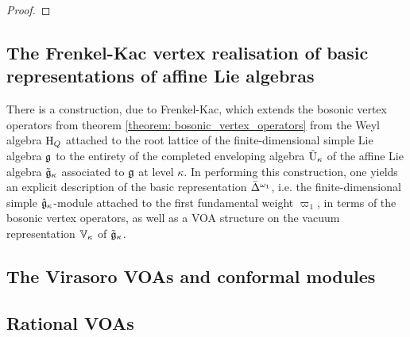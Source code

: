             \begin{theorem} \label{theorem: bosonic_vertex_operators}
                
            \end{theorem}
                \begin{proof}
                    
                \end{proof}

    \subsection{The Frenkel-Kac vertex realisation of basic representations of affine Lie algebras}
        There is a construction, due to Frenkel-Kac, which extends the bosonic vertex operators from theorem \ref{theorem: bosonic_vertex_operators} from the Weyl algebra $\mathrm{H}_Q$ attached to the root lattice of the finite-dimensional simple Lie algebra $\mathfrak{g}$ to the entirety of the completed enveloping algebra $\tilde{\mathrm{U}}_{\kappa}$ of the affine Lie algebra $\tilde{\mathfrak{g}}_{\kappa}$ associated to $\mathfrak{g}$ at level $\kappa$. In performing this construction, one yields an explicit description of the basic representation $\bar{\Delta}^{\omega_1}$, i.e. the finite-dimensional simple $\hat{\mathfrak{g}}_{\kappa}$-module attached to the first fundamental weight $\varpi_1$, in terms of the bosonic vertex operators, as well as a VOA structure on the vacuum representation $\mathbb{V}_{\kappa}$ of $\tilde{\mathfrak{g}}_{\kappa}$.

    \subsection{The Virasoro VOAs and conformal modules}

    \subsection{Rational VOAs}